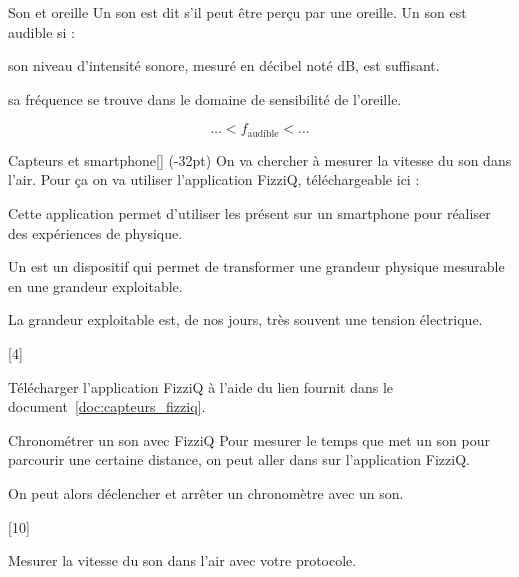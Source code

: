 \begin{doc}{Son et oreille}
  Un son est dit  s'il peut être perçu par une oreille.
  Un son est audible si :
  \begin{listePoints}
    \item son niveau d'intensité sonore, mesuré en décibel noté dB, est suffisant.
    \item sa fréquence se trouve dans le domaine de sensibilité de l'oreille.
  \end{listePoints}
  \begin{equation*}
      \ldots < f_\text{audible} < \ldots
  \end{equation*}
\end{doc}

\begin{doc}{Capteurs et smartphone}[\label{doc:capteurs_fizziq}]
  (-32pt)
  On va chercher à mesurer la vitesse du son dans l'air.
  Pour ça on va utiliser l'application FizziQ, téléchargeable ici :
  
  Cette application permet d'utiliser les  présent sur un smartphone pour réaliser des expériences de physique.
  
  \begin{importants}
    Un  est un dispositif qui permet de transformer une grandeur physique mesurable en une grandeur exploitable.
  \end{importants}
  La grandeur exploitable est, de nos jours, très souvent une tension électrique.
\end{doc}

[4]

\telechargement
Télécharger l'application FizziQ à l'aide du lien fournit dans le document~\ref{doc:capteurs_fizziq}.

\begin{doc}{Chronométrer un son avec FizziQ}
  Pour mesurer le temps que met un son pour parcourir une certaine distance, on peut aller dans  sur l'application FizziQ.

  On peut alors déclencher et arrêter un chronomètre avec un son.
\end{doc}

[10]

\mesure Mesurer la vitesse du son dans l'air avec votre protocole.
